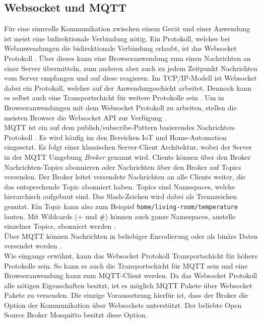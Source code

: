 \subsection{Websocket und MQTT}
\label{subs:websocket-und-mqtt}

Für eine sinnvolle Kommunikation zwischen einem Gerät und einer Anwendung ist meist
eine bidirektionale Verbindung nötig. Ein Protokoll, welches bei Webanwendungen die 
bidirektionale Verbindung erlaubt, ist das Websocket Protokoll \cite{rfc-websocket}. Über dieses
kann eine Browseranwendung zum einen Nachrichten an einer Server übermitteln, zum anderen 
aber auch zu jedem Zeitpunkt Nachrichten vom Server empfangen und auf diese reagieren.
Im TCP/IP-Modell ist Websocket dabei ein Protokoll, welches auf der Anwendungsschicht arbeitet. 
Dennoch kann es selbst auch eine Transportschicht für weitere Protokolle sein \cite{websocket-definitive}.
Um in Browseranwendungen mit dem Websocket Protokoll zu arbeiten, stellen die meisten 
Browser die Websocket API zur Verfügung \cite{websocket-api}.\\

MQTT ist ein auf dem publish/subscribe-Pattern basierendes Nachrichten-Protokoll \cite{mqtt-standard}.
Es wird häufig im den Bereichen IoT und Home-Automation eingesetzt. Es folgt einer
klassischen Server-Client Architektur, wobei der Server in der MQTT Umgebung \emph{Broker}
genannt wird. Clients können über den Broker Nachrichten-Topics abonnieren oder Nachrichten
über den Broker auf Topics versenden. Der Broker leitet versendete Nachrichten an alle Clients
weiter, die das entsprechende Topic abonniert haben. Topics sind Namespaces, welche hierarchisch
aufgebaut sind. Das Slash-Zeichen wird dabei als Trennzeichen genutzt. Ein Topic kann also zum 
Beispiel \texttt{home/living-room/temperature} lauten. Mit Wildcards (+ und \#) können auch ganze
Namespaces, anstelle einzelner Topics, abonniert werden \cite{mqtt-man-page}.\\
Über MQTT können Nachrichten in beliebiger Encodierung oder als binäre Daten versendet werden
\cite{mqtt-essentials-part-4}.\\

Wie eingangs erwähnt, kann das Websocket Protokoll Transportschicht für
höhere Protokolle sein. So kann es auch die Transportschicht für MQTT sein und eine Browseranwendung
kann zum MQTT-Client werden. Da das Websocket Protokoll alle nötigen Eigenschaften besitzt, ist es
möglich MQTT Pakete über Websocket Pakete zu versenden. Die einzige Voraussetzung hierfür ist, dass der Broker
die Option der Kommunikation über Websockets unterstützt. Der beliebte Open Source Broker Mosquitto \cite{mosquitto}
besitzt diese Option.